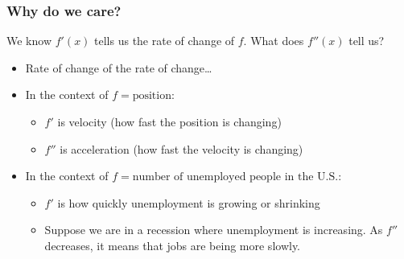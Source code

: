 \subsubsection{Why do we care?}
We know $f'(x)$ tells us the rate of change of $f$. What does $f''(x)$ tell us?
\begin{itemize}
    \item Rate of change of the rate of change\ldots
    \item In the context of $f = \text{position}$:
    \begin{itemize}
        \item $f'$ is velocity (how fast the position is changing)
        \item $f''$ is acceleration (how fast the velocity is changing)
    \end{itemize}
    \item In the context of $f = \text{number of unemployed people in the U.S.}$:
    \begin{itemize}
        \item $f'$ is how quickly unemployment is growing or shrinking
        \item Suppose we are in a recession where unemployment is increasing. As $f''$ decreases, it means that jobs are being more slowly.
    \end{itemize}
\end{itemize}
